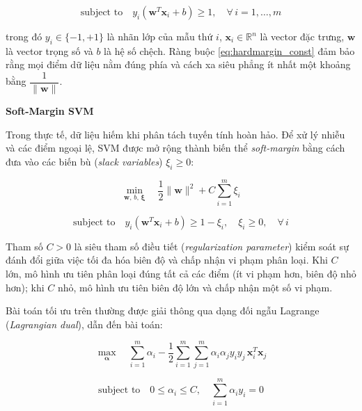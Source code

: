 \begin{equation}
  \text{subject to} \quad y_i\!\left(\mathbf{w}^T \mathbf{x}_i + b\right) \geq 1,
  \quad \forall\, i = 1, \ldots, m
  \label{eq:hardmargin_const}
\end{equation}

\noindent trong đó $y_i \in \{-1, +1\}$ là nhãn lớp của mẫu thứ $i$, $\mathbf{x}_i \in \mathbb{R}^n$ là vector đặc trưng, $\mathbf{w}$ là vector trọng số và $b$ là hệ số chệch. Ràng buộc \eqref{eq:hardmargin_const} đảm bảo rằng mọi điểm dữ liệu nằm đúng phía và cách xa siêu phẳng ít nhất một khoảng bằng $\dfrac{1}{\|\mathbf{w}\|}$.

\textbf{Soft-Margin SVM}

Trong thực tế, dữ liệu hiếm khi phân tách tuyến tính hoàn hảo. Để xử lý nhiễu và các điểm ngoại lệ, SVM được mở rộng thành biến thể \textit{soft-margin} bằng cách đưa vào các biến bù (\textit{slack variables}) $\xi_i \geq 0$:

\begin{equation}
  \min_{\mathbf{w},\, b,\, \boldsymbol{\xi}} \quad
  \frac{1}{2}\|\mathbf{w}\|^2 + C \sum_{i=1}^{m} \xi_i
  \label{eq:softmargin_obj}
\end{equation}

\begin{equation}
  \text{subject to} \quad y_i\!\left(\mathbf{w}^T \mathbf{x}_i + b\right)
  \geq 1 - \xi_i, \quad \xi_i \geq 0, \quad \forall\, i
  \label{eq:softmargin_const}
\end{equation}

\noindent Tham số $C > 0$ là siêu tham số điều tiết (\textit{regularization parameter}) kiểm soát sự đánh đổi giữa việc tối đa hóa biên độ và chấp nhận vi phạm phân loại. Khi $C$ lớn, mô hình ưu tiên phân loại đúng tất cả các điểm (ít vi phạm hơn, biên độ nhỏ hơn); khi $C$ nhỏ, mô hình ưu tiên biên độ lớn và chấp nhận một số vi phạm.


Bài toán tối ưu trên thường được giải thông qua dạng đối ngẫu Lagrange (\textit{Lagrangian dual}), dẫn đến bài toán:

\begin{equation}
  \max_{\boldsymbol{\alpha}} \quad
  \sum_{i=1}^{m} \alpha_i
  - \frac{1}{2} \sum_{i=1}^{m} \sum_{j=1}^{m}
    \alpha_i \alpha_j y_i y_j\, \mathbf{x}_i^T \mathbf{x}_j
  \label{eq:dual_obj}
\end{equation}

\begin{equation}
  \text{subject to} \quad 0 \leq \alpha_i \leq C,
  \quad \sum_{i=1}^{m} \alpha_i y_i = 0
  \label{eq:dual_const}
\end{equation}

